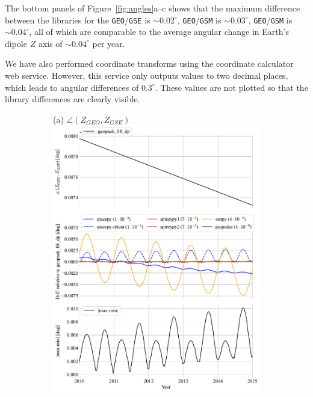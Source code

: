 \documentclass[draft]{agujournal2019}
\begin{document}
The bottom panels of Figure~\ref{fig:angles}a--c shows that the maximum difference between the libraries for the \texttt{GEO}/\texttt{GSE} is ${\sim}0.02^\circ$,  \texttt{GEO}/\texttt{GSM} is ${\sim} 0.03^\circ$, \texttt{GEO}/\texttt{GSM} is ${\sim}0.04^\circ$, all of which are comparable to the average angular change in Earth's dipole $Z$ axis of ${\sim}0.04^\circ$ per year.


We have also performed coordinate transforms using the  coordinate calculator web service. However, this service only outputs values to two decimal places, which leads to angular differences of $0.3^\circ$. These values are not plotted so that the library differences are clearly visible.

\begin{figure}[htb]
     \begin{subfigure}[b]{0.49\textwidth}
         (a) $\angle (Z_{GEO}, Z_{GSE})$
         \centering
         \includegraphics[width=\textwidth]{code/figures/angles/z-delta=1days_20100101-20150101/GEO_GSE.pdf}

\end{subfigure}
\end{figure}
\end{document}
